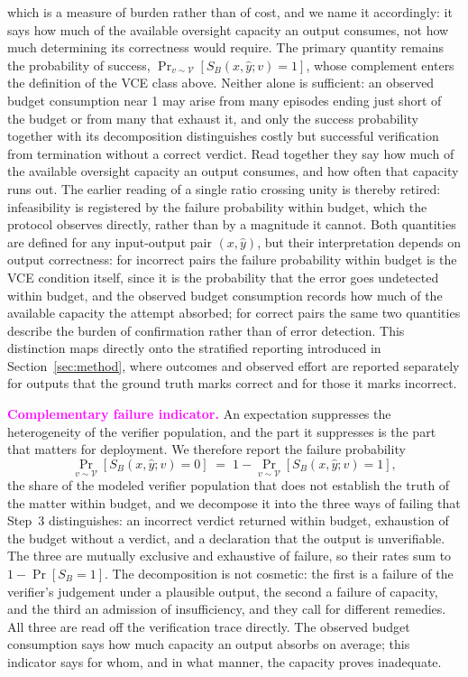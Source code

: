 \documentclass[11pt]{article}
\newcommand{\rev}[1]{\textcolor{magenta}{#1}}
\newcommand{\viola}[1]{\textcolor[HTML]{7030A0}{#1}}
\newcommand{\rev}[1]{#1}
\newcommand{\viola}[1]{#1}
\begin{document}
\viola{which is a measure of burden rather than of cost, and we name it accordingly: it says how much of the available oversight capacity an output consumes, not how much determining its correctness would require. The primary quantity remains the probability of success, \mbox{$\Pr_{v\sim\mathcal{V}}[S_B(x,\hat{y};v)=1]$}, whose complement enters the definition of the VCE class above. \viola{Neither alone is sufficient: an observed budget consumption near 1 may arise from many episodes ending just short of the budget or from many that exhaust it, \viola{and only the success probability together with its decomposition distinguishes costly but successful verification from termination without a correct verdict.}} Read together they say how much of the available oversight capacity an output consumes, and how often that capacity runs out. The earlier reading of a single ratio crossing unity is thereby retired: \viola{infeasibility is registered by the failure probability within budget, which the protocol observes directly, rather than by a magnitude it cannot.}} Both quantities are defined for any input-output pair \((x,\hat{y})\), but their interpretation depends on output correctness: \viola{for incorrect pairs \viola{the failure probability within budget} is the VCE condition itself, since it is the probability that the error goes undetected within budget, \viola{and the observed budget consumption records how much of the available capacity the attempt absorbed;} \viola{for correct pairs the same two quantities describe the burden of confirmation rather than of error detection.}} \viola{This distinction maps directly onto the stratified reporting introduced in Section~\ref{sec:method}, where outcomes and observed effort are reported separately for outputs that the ground truth marks correct and for those it marks incorrect.}

\rev{\textbf{Complementary failure indicator.}} \viola{An expectation suppresses the heterogeneity of the verifier population, and the part it suppresses is the part that matters for deployment. We therefore report the failure probability
\[
\Pr_{v\sim\mathcal{V}}\!\left[S_B(x,\hat{y};v)=0\right] \;=\; 1-\Pr_{v\sim\mathcal{V}}\!\left[S_B(x,\hat{y};v)=1\right],
\]
the share of the modeled verifier population that does not establish the truth of the matter within budget, and we decompose it into the three ways of failing that Step~3 distinguishes: an incorrect verdict returned within budget, exhaustion of the budget without a verdict, and a declaration that the output is unverifiable. \viola{The three are mutually exclusive and exhaustive of failure, so their rates sum to \mbox{$1-\Pr[S_B=1]$}.} The decomposition is not cosmetic: the first is a failure of the verifier's judgement under a plausible output, the second a failure of capacity, and the third an admission of insufficiency, and they call for different remedies. All three are read off the verification trace directly. The observed budget consumption says how much capacity an output absorbs on average; this indicator says for whom, and in what manner, the capacity proves inadequate.}
\end{document}
